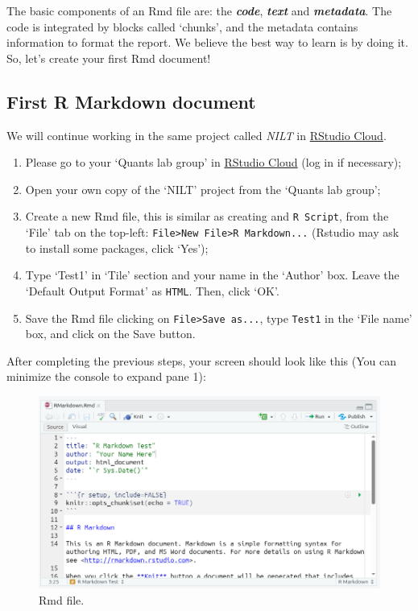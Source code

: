 \documentclass[
]{book}
\providecommand{\tightlist}{%
  \setlength{\itemsep}{0pt}\setlength{\parskip}{0pt}}
\begin{document}
The basic components of an Rmd file are: the \textbf{\emph{code}}, \textbf{\emph{text}} and \textbf{\emph{metadata}}. The code is integrated by blocks called `chunks', and the metadata contains information to format the report. We believe the best way to learn is by doing it. So, let's create your first Rmd document!

\hypertarget{first-r-markdown-document}{%
\subsection{First R Markdown document}\label{first-r-markdown-document}}

We will continue working in the same project called \emph{NILT} in \href{https://rstudio.cloud/}{RStudio Cloud}.

\begin{enumerate}
\def\labelenumi{\arabic{enumi}.}
\tightlist
\item
  Please go to your `Quants lab group' in \href{https://rstudio.cloud/}{RStudio Cloud} (log in if necessary);
\item
  Open your own copy of the `NILT' project from the `Quants lab group';
\item
  Create a new Rmd file, this is similar as creating and \texttt{R\ Script}, from the `File' tab on the top-left: \texttt{File\textgreater{}New\ File\textgreater{}R\ Markdown...} (Rstudio may ask to install some packages, click `Yes');
\item
  Type `Test1' in `Tile' section and your name in the `Author' box. Leave the `Default Output Format' as \texttt{HTML}. Then, click `OK'.
\item
  Save the Rmd file clicking on \texttt{File\textgreater{}Save\ as...}, type \texttt{Test1} in the `File name' box, and click on the Save button.
\end{enumerate}

After completing the previous steps, your screen should look like this (You can minimize the console to expand pane 1):

\begin{figure}

\includegraphics[width=1\linewidth]{./images/lab4_rmd_view} \hfill{}

\caption{Rmd file.}\label{fig:rmd-file}
\end{figure}
\end{document}
